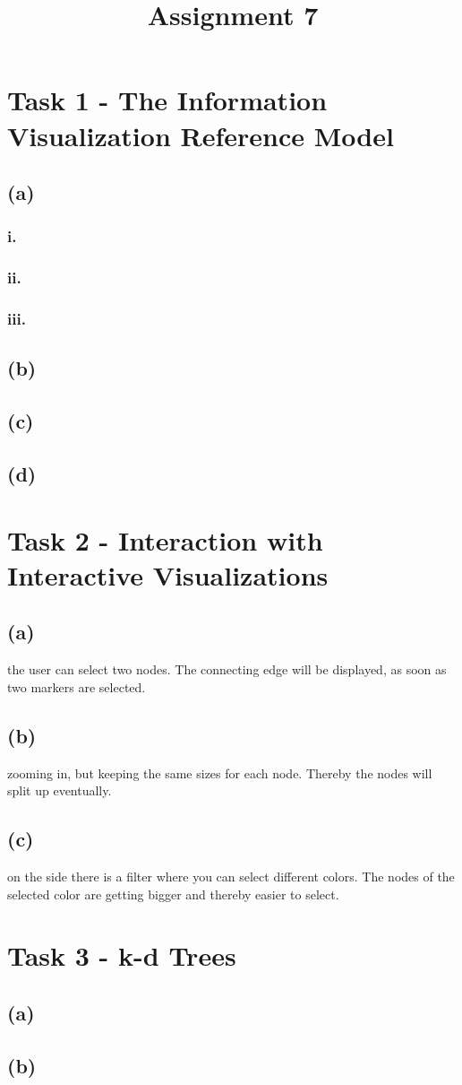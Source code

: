 \documentclass[a4paper]{article}
\date{}
\author{}
\title{\textbf{Assignment 7}}
\begin{document}
\maketitle 
\thispagestyle{fancy}

\section*{Task 1 - The Information Visualization Reference Model}
\subsection*{(a)}
\subsubsection*{i.}
\subsubsection*{ii.}
\subsubsection*{iii.}
\subsection*{(b)}
\subsection*{(c)}
\subsection*{(d)}

\section*{Task 2 - Interaction with Interactive Visualizations}
\subsection*{(a)} the user can select two nodes. The connecting edge will be displayed, as soon as two markers are selected.
\subsection*{(b)} zooming in, but keeping the same sizes for each node. Thereby the nodes will split up eventually.
\subsection*{(c)} on the side there is a filter where you can select different colors. The nodes of the selected color are getting bigger and thereby easier to select.

\section*{Task 3 - k-d Trees}
\subsection*{(a)}
\subsection*{(b)}
\end{document}
